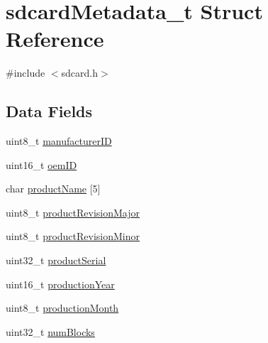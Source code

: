 \hypertarget{structsdcardMetadata__t}{\section{sdcard\+Metadata\+\_\+t Struct Reference}
\label{structsdcardMetadata__t}
}


{\ttfamily \#include $<$sdcard.\+h$>$}

\subsection*{Data Fields}
\begin{DoxyCompactItemize}
\item 
uint8\+\_\+t \hyperlink{structsdcardMetadata__t_a3f0da8fca31669569d85eaae71ad5cbe}{manufacturer\+I\+D}
\item 
uint16\+\_\+t \hyperlink{structsdcardMetadata__t_a2cfb45a7c55329e52ed0d501d0afb10d}{oem\+I\+D}
\item 
char \hyperlink{structsdcardMetadata__t_a38244751d4c6a70e265e07c57f2cb3ea}{product\+Name} \mbox{[}5\mbox{]}
\item 
uint8\+\_\+t \hyperlink{structsdcardMetadata__t_ab75109da7824782c91d2396d997daabc}{product\+Revision\+Major}
\item 
uint8\+\_\+t \hyperlink{structsdcardMetadata__t_aff1572b9b561a856b1e93a0d4fbcb580}{product\+Revision\+Minor}
\item 
uint32\+\_\+t \hyperlink{structsdcardMetadata__t_a528ed317b5b03ac4cf66e07abd4b9ac9}{product\+Serial}
\item 
uint16\+\_\+t \hyperlink{structsdcardMetadata__t_ae1deaaabf9547a5f892d25843be4260a}{production\+Year}
\item 
uint8\+\_\+t \hyperlink{structsdcardMetadata__t_a412979af914ca3731f4a74ae5bc78e04}{production\+Month}
\item 
uint32\+\_\+t \hyperlink{structsdcardMetadata__t_a20b075fbadbe3cd318f94c3114069f2d}{num\+Blocks}
\end{DoxyCompactItemize}


